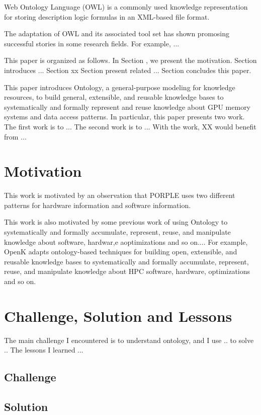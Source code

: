 \documentclass{sig-alternate}
\begin{document}
Web Ontology Language (OWL) \cite{owl1, owl2} is a commonly used knowledge representation for storing description logic formulas in an XML-based file format.

The adaptation of OWL and its associated tool set has shown promosing successful stories in some research fields. For example, ...

This paper is organized as follows. In Section , we present the motivation. Section introduces ... Section xx Section present related ... Section concludes this paper.

This paper introduces Ontology, a general-purpose modeling for knowledge resources, to build general, extensible, and reusable knowledge bases to systematically and formally represent and reuse knowledge about GPU memory systems and data access patterns. In particular, this paper presents two work. The first work is to ... The second work is to ... With the work, XX would benefit from ...

\section{Motivation}
This work is motivated by an observation that PORPLE uses two different patterns for hardware information and software information.

This work is also motivated by some previous work of using Ontology to systematically and formally accumulate, represent, reuse, and manipulate knowledge about software, hardwar,e aoptimizations and so on.... For example, OpenK \cite{OpenK} adapts ontology-based techniques for building open, extensible, and reusable knowledge bases to systematically and formally accumulate, represent, reuse, and manipulate knowledge about HPC software, hardware, optimizations and so on.

\section{Challenge, Solution and Lessons}
The main challenge I encountered is to understand ontology, and I use .. to solve .. The lessons I learned ...

\subsection{Challenge}

\subsection{Solution}
\end{document}
